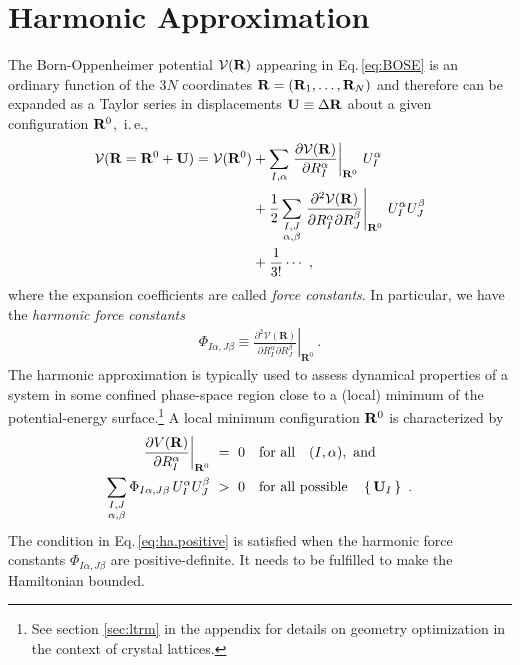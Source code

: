 \section{Harmonic Approximation}
The Born-Oppenheimer potential $\mathcal V ({\bf R})$ appearing in Eq.\,\eqref{eq:BOSE} is an ordinary function of the $3 N$ coordinates ${\bf R} = ({\bf R}_1, \ldots, {\bf R}_{N})$ and therefore can be expanded as a Taylor series in displacements ${\bf U} \equiv \Delta {\bf R}$ about a given configuration ${\bf R}^0$,~i.\,e.,
\begin{align}
\begin{split}
  \mathcal V ({\bf R} = {\bf R}^0 + {\bf U})
    = \mathcal V ({\bf R}^0)
    &+ \sum_{I, \alpha} 
      \left. \frac{\partial \mathcal V({\bf R})}{\partial R^\alpha_I} 
      \right\vert_{{\bf R}^0}
    \,U^\alpha_I
    \\
    &
    + \frac{1}{2}
    \sum_{\substack{I, J \\ \alpha, \beta}}
    \left.\frac{\partial^{2} \mathcal{V}(\mathbf{R})}{\partial R_{I}^{\alpha} \partial R_{J}^{\beta}}\right|_{\mathbf{R}^{0}}
    \, U_I^\alpha U_J^\beta
    \\
    &+\frac{1}{3!}\cdots ~,
\end{split}
\end{align}
where the expansion coefficients are called \emph{force constants}. In particular, we have the \emph{harmonic force constants}
\begin{align}
  \Phi_{I \alpha, J \beta}
  \equiv \left.\frac{\partial^{2} \mathcal{V}(\mathbf{R})}{\partial R_{I}^{\alpha} \partial R_{J}^{\beta}}\right|_{\mathbf{R}^{0}}~.
  \label{eq:FC2}
\end{align}
The harmonic approximation is typically used to assess dynamical properties of a system in some confined phase-space region close to a (local) minimum of the potential-energy surface.\footnote{See section \ref{sec:ltrm} in the appendix for details on geometry optimization in the context of crystal lattices.} A local minimum configuration ${\bf R}^0$ is characterized by
\begin{align}
	\left. \frac{\partial V({\bf R})}{\partial R^\alpha_I} 
	\right\vert_{{\bf R}^0} 
		&~=~ 0 \quad\text{for all}\quad (I, \alpha),~\text{and} \\
	\sum_{\substack{I, J \\ \alpha, \beta}}
	\Phi_{I \alpha, J \beta}
	\, U_I^\alpha U_J^\beta
		&~>~ 0 \quad\text{for all possible}\quad \set{{\bf U}_I}~.
	\label{eq:ha.positive}
\end{align}
The condition in Eq.\,\eqref{eq:ha.positive} is satisfied when the harmonic force constants $\Phi_{I \alpha, J \beta}$ are positive-definite. It needs to be fulfilled to make the Hamiltonian bounded.

